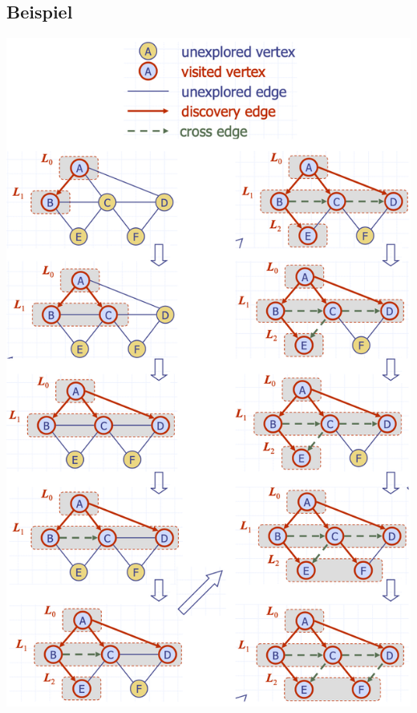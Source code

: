 \subsection{Beispiel}
\begin{center}
    \includegraphics[scale=.3]{graphic/13 BFS/bsp.png}
\end{center}
\vspace{-8pt}

